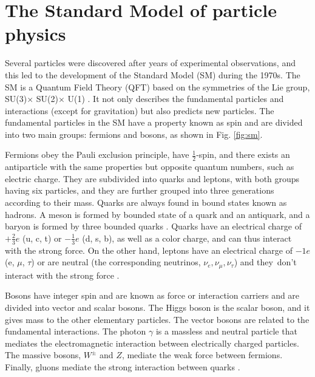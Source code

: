 \chapter{\leavevmode\newline The Standard Model of particle physics}
\label{chap:chapter_1}
Several particles were discovered after years of experimental observations, and this led to the development of the Standard Model (SM) during the 1970s. The SM is a Quantum Field Theory (QFT) based on the symmetries of the Lie group, SU(3)$ \times$ SU(2)$ \times$ U(1) \cite{stiller2016full}. It not only describes the fundamental particles and interactions (except for gravitation) but also predicts new particles. The fundamental particles in the SM have a property known as spin and are divided into two main groups: fermions and bosons, as shown in Fig. \ref{fig:sm}.

Fermions obey the Pauli exclusion principle, have $\frac{1}{2}$-spin, and there exists an antiparticle with the same properties but opposite quantum numbers, such as electric charge. They are subdivided into quarks and leptons, with both groups having six particles, and they are further grouped into three generations according to their mass. Quarks are always found in bound states known as hadrons. A meson is formed by bounded state of a quark and an antiquark, and a baryon is formed by three bounded quarks \cite{stiller2016full, fedi2016studies, grummer2021search}. Quarks have an electrical charge of $+\frac{2}{3}e$ (u, c, t) or $-\frac{1}{3}e$ (d, s, b), as well as a color charge, and can thus interact with the strong force. On the other hand, leptons have an electrical charge of $-1e$ (e, $\mu$, $\tau$) or are neutral (the corresponding neutrinos, $\nu_e, \nu_\mu, \nu_\tau$) and they don't interact with the strong force \cite{bonanomi2021response, bragagnolo2021measurement}.

Bosons have integer spin and are known as force or interaction carriers and are divided into vector and scalar bosons. The Higgs boson is the scalar boson, and it gives mass to the other elementary particles. The vector bosons are related to the fundamental interactions. The photon $\gamma$ is a massless and neutral particle that mediates the electromagnetic interaction between electrically charged particles. The massive bosons, $W^{\pm}$ and $Z$, mediate the weak force between fermions. Finally, gluons mediate the strong interaction between quarks \cite{grummer2021search, bragagnolo2021measurement}.

